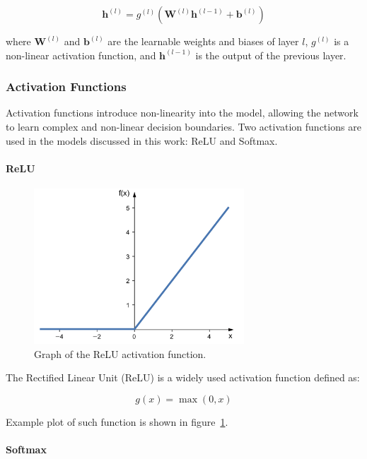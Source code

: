 \documentclass{pracalicmgr}
\begin{document}
\[
\mathbf{h}^{(l)} = g^{(l)}(\mathbf{W}^{(l)} \mathbf{h}^{(l-1)} + \mathbf{b}^{(l)})
\]

where \( \mathbf{W}^{(l)} \) and \( \mathbf{b}^{(l)} \) are the learnable weights and biases of layer \( l \), \( g^{(l)} \) is a non-linear activation function, and \( \mathbf{h}^{(l-1)} \) is the output of the previous layer.

\subsubsection{Activation Functions}

Activation functions introduce non-linearity into the model, allowing the network to learn complex and non-linear decision boundaries. Two activation functions are used in the models discussed in this work: ReLU and Softmax.

\paragraph{ReLU}

\begin{figure}[H]
\centering
\includegraphics[width=0.7\textwidth]{src/relu.png}
\caption{Graph of the ReLU activation function.\cite{raschkaRelu}}
\label{fig:relu}
\end{figure}

The Rectified Linear Unit (ReLU) is a widely used activation function defined as:

\[
g(x) = \max(0, x)
\]

Example plot of such function is shown in figure~\ref{fig:relu}.

\paragraph{Softmax}
\end{document}
